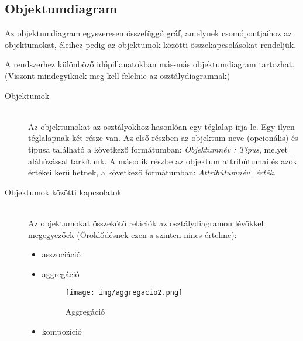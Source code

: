 \documentclass[margin=0px]{article}
\begin{document}
		\subsection{Objektumdiagram}
			Az objektumdiagram egyszeresen összefüggő gráf, amelynek csomópontjaihoz az objektumokat, éleihez pedig az objektumok közötti összekapcsolásokat rendeljük.
			
			A rendszerhez különböző időpillanatokban más-más objektumdiagram tartozhat. (Viszont mindegyiknek meg kell felelnie az osztálydiagramnak)
			
			\begin{description}
				\item[Objektumok] \hfill \\
					Az objektumokat az osztályokhoz hasonlóan egy téglalap írja le. Egy ilyen téglalapnak két része van. Az első részben az objektum neve (opcionális) és típusa található a következő formátumban: \textit{Objektumnév : Típus}, melyet aláhúzással tarkítunk. A második részbe az objektum attribútumai és azok értékei kerülhetnek, a következő formátumban: \textit{Attribútumnév=érték}.
\iffalse						
						\begin{figure}[H]
							\centering
							\texttt{[image: img/objektum.png]}
							\caption{Objektum}
						\end{figure}
\fi
				\item[Objektumok közötti kapcsolatok] \hfill \\
					Az objektumokat összekötő relációk az osztálydiagramon lévőkkel megegyezőek (Öröklődésnek ezen a szinten nincs értelme):
						\begin{itemize}
							\item asszociáció

\iffalse
								\begin{figure}[H]
									\centering
									\texttt{[image: img/asszociacio2.png]}
									\caption{Asszociáció}
								\end{figure}
\fi
							\item aggregáció
								\begin{figure}[H]
									\centering
									\texttt{[image: img/aggregacio2.png]}
									\caption{Aggregáció}
								\end{figure}
							\item kompozíció
\iffalse
								\begin{figure}[H]
									\centering
									\texttt{[image: img/kompozicio2.png]}
									\caption{Aggregáció}
								\end{figure}
\fi
						\end{itemize}
			\end{description}
\end{document}
